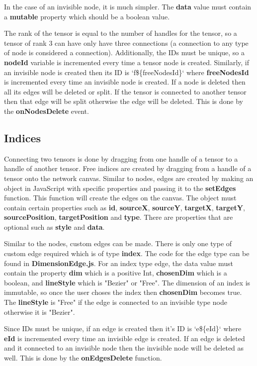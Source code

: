\documentclass{juliacon}
\begin{document}
\begin{appendix}
In the case of an invisible node, it is much simpler. The \textbf{data} value must contain a \textbf{mutable} property which should be a boolean value. 

The rank of the tensor is equal to the number of handles for the tensor, so a tensor of rank 3 can have only have three connections (a connection to any type of node is considered a connection). Additionally, the IDs must be unique, so a \textbf{nodeId} variable is incremented every time a tensor node is created. Similarly, if an invisible node is created then its ID is `f\$\{freeNodesId\}` where \textbf{freeNodesId} is incremented every time an invisible node is created. If a node is deleted then all its edges will be deleted or split. If the tensor is connected to another tensor then that edge will be split otherwise the edge will be deleted. This is done by the \textbf{onNodesDelete} event.

\subsection{Indices}
Connecting two tensors is done by dragging from one handle of a tensor to a handle of another tensor. Free indices are created by dragging from a handle of a tensor onto the network canvas.
Similar to nodes, edges are created by making an object in JavaScript with specific properties and passing it to the \textbf{setEdges} function. This function will create the edges on the canvas. The object must contain certain properties such as \textbf{id}, \textbf{sourceX}, \textbf{sourceY}, \textbf{targetX}, \textbf{targetY}, \textbf{sourcePosition}, \textbf{targetPosition} and \textbf{type}. There are properties that are optional such as \textbf{style} and \textbf{data}.

Similar to the nodes, custom edges can be made. There is only one type of custom edge required which is of type \textbf{index}. The code for the edge type can be found in \textbf{DimensionEdge.js}. For an index type edge, the data value must contain the property \textbf{dim} which is a positive Int, \textbf{chosenDim} which is a boolean, and \textbf{lineStyle} which is "Bezier" or "Free". The dimension of an index is immutable, so once the user choses the index then \textbf{chosenDim} becomes true. The \textbf{lineStyle} is "Free" if the edge is connected to an invisible type node otherwise it is "Bezier".

Since IDs must be unique, if an edge is created then it's ID is `e\$\{eId\}` where \textbf{eId} is incremented every time an invisible edge is created. If an edge is deleted and it connected to an invisible node then the invisible node will be deleted as well. This is done by the \textbf{onEdgesDelete} function.



\end{appendix}
\end{document}
